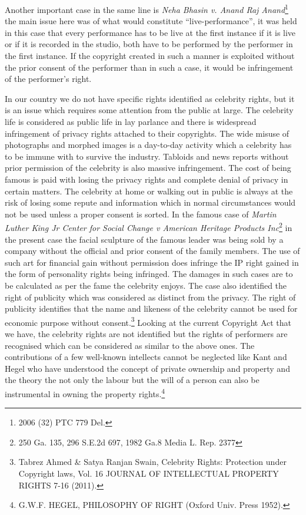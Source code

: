 \begin{multicols}{2}
\noi
Another important case in the same line is \textit{Neha Bhasin v. Anand Raj Anand}\footnote{2006 (32) PTC 779 Del.} the main issue
here was of what would constitute “live-performance”, it was held in this case that every
performance has to be live at the first instance if it is live or if it is recorded in the studio,
both have to be performed by the performer in the first instance. If the copyright created in such a manner is exploited without the prior consent of the performer than in such a case, it
would be infringement of the performer’s right. 


\noi
In our country we do not have specific rights identified as celebrity rights, but it is an issue
which requires some attention from the public at large. The celebrity life is considered as
public life in lay parlance and there is widespread infringement of privacy rights attached to
their copyrights. The wide misuse of photographs and morphed images is a day-to-day
activity which a celebrity has to be immune with to survive the industry. Tabloids and news
reports without prior permission of the celebrity is also massive infringement. The cost of
being famous is paid with losing the privacy rights and complete denial of privacy in certain
matters. The celebrity at home or walking out in public is always at the risk of losing some
repute and information which in normal circumstances would not be used unless a proper
consent is sorted. In the famous case of \textit{Martin Luther King Jr Center for Social Change v
American Heritage Products Inc}\footnote{250 Ga. 135, 296 S.E.2d 697, 1982 Ga.8 Media L. Rep. 2377} in the present case the facial sculpture of the famous
leader was being sold by a company without the official and prior consent of the family
members. The use of such art for financial gain without permission does infringe the IP right
gained in the form of personality rights being infringed. The damages in such cases are to be
calculated as per the fame the celebrity enjoys. The case also identified the right of publicity
which was considered as distinct from the privacy. The right of publicity identifies that the
name and likeness of the celebrity cannot be used for economic purpose without consent.\footnote{Tabrez Ahmed \& Satya Ranjan Swain, Celebrity Rights: Protection under Copyright laws, Vol. 16
JOURNAL OF INTELLECTUAL PROPERTY RIGHTS 7-16 (2011). }
Looking at the current Copyright Act that we have, the celebrity rights are not identified but
the rights of performers are recognised which can be considered as similar to the above ones.
The contributions of a few well-known intellects cannot be neglected like Kant and Hegel
who have understood the concept of private ownership and property and the theory the not
only the labour but the will of a person can also be instrumental in owning the property
rights.\footnote{G.W.F. HEGEL, PHILOSOPHY OF RIGHT (Oxford Univ. Press 1952).}


\end{multicols}
